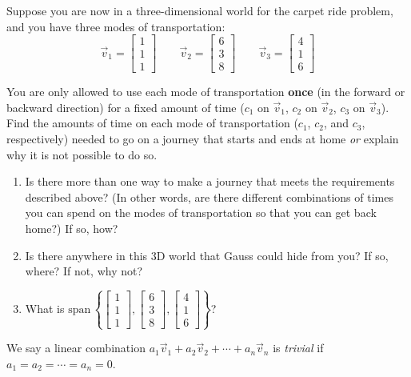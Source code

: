 \documentclass[14pt]{problemset}
\newcommand{\Span}{\mathrm{span}\,}
\newcommand{\mat}[1]{\begin{bmatrix}#1\end{bmatrix}}
\begin{document}
Suppose you are now in a three-dimensional world for the carpet
ride problem, and you have three modes of transportation:
\[
	\vec v_1 = \mat{1 \\1 \\ 1}\qquad
	\vec v_2 = \mat{6 \\3 \\ 8}\qquad
	\vec v_3 = \mat{4 \\1 \\ 6}
\]

You are only allowed to use each mode of transportation \textbf{once}
(in the forward or backward direction) for a fixed amount of time ($c_1$
on $\vec v_1$, $c_2$ on $\vec v_2$, $c_3$ on $\vec v_3$). Find the amounts of time on
each mode of transportation ($c_1$, $c_2$,  and $c_3$, respectively)
needed to go on a journey that starts and ends at home \emph{or} explain why
it is not possible to do so.

\vspace{10mm}

\newpage

\begin{enumerate}
	\item Is there more than one way to make a journey that meets the
	requirements described above? (In other words, are there different
	combinations of times you can spend on the modes of transportation so
	that you can get back home?) If so, how?

	\vspace{65mm} 
	\item Is there anywhere in this 3D world that Gauss
	  could hide from you? If so, where? If not, why not?

	\vspace{65mm}
	\item What is $\Span \left\{\mat{1 \\1 \\  1},\mat{6 \\3 \\ 8},\mat{4  \\1 \\ 6} \right\}$?

\end{enumerate}


\newpage
\pagestyle{siefken}




	\begin{definition}
	We say a linear combination 
	$a_1\vec v_1+a_2\vec v_2+\cdots +a_n\vec v_n$
	is \emph{trivial} if $a_1=a_2=\cdots=a_n=0$.
	\end{definition}
	
\end{document}
